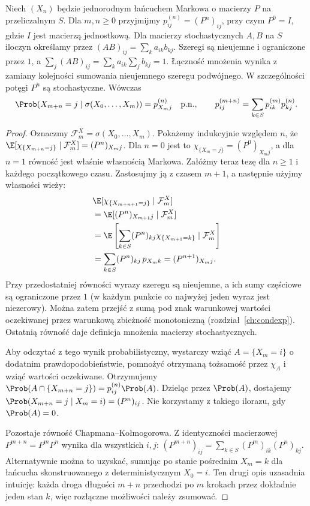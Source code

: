 \begin{twierdzenie}
\label{thm:rp1-12-chapman-kolmogorov}
Niech $(X_n)$ będzie jednorodnym łańcuchem Markowa
o macierzy $P$ na przeliczalnym $S$. Dla $m,n\geq0$
przyjmijmy $p_{ij}^{(n)}=(P^n)_{ij}$, przy czym
$P^0=I$, gdzie $I$ jest macierzą jednostkową.
Dla macierzy stochastycznych $A,B$ na $S$
iloczyn określamy przez $(AB)_{ij}=\sum_k a_{ik}b_{kj}$.
Szeregi są nieujemne i ograniczone przez $1$, a
$\sum_j(AB)_{ij}=\sum_k a_{ik}\sum_j b_{kj}=1$.
Łączność mnożenia wynika z zamiany kolejności
sumowania nieujemnego szeregu podwójnego.
W szczególności potęgi $P^n$ są stochastyczne.
Wówczas
\[
\Prob(X_{m+n}=j\mid\sigma(X_0,\ldots,X_m))
=p^{(n)}_{X_mj}\quad\text{p.n.},\qquad
p_{ij}^{(m+n)}=\sum_{k\in S}p_{ik}^{(m)}p_{kj}^{(n)}.
\]
\end{twierdzenie}
\begin{proof}
Oznaczmy $\mathcal F_m^X=\sigma(X_0,\ldots,X_m)$.
Pokażemy indukcyjnie względem $n$, że
$\E[\chi_{\{X_{m+n}=j\}}\mid\mathcal F_m^X]
=(P^n)_{X_mj}$. Dla $n=0$ jest to
$\chi_{\{X_m=j\}}=(P^0)_{X_mj}$, a dla $n=1$
równość jest właśnie własnością Markowa.
Załóżmy teraz tezę dla $n\geq1$ i każdego
początkowego czasu. Zastosujmy ją z czasem $m+1$,
a następnie użyjmy własności wieży:
\begin{align*}
&\E[\chi_{\{X_{m+n+1}=j\}}\mid\mathcal F_m^X]\\
&=\E[(P^n)_{X_{m+1}j}\mid\mathcal F_m^X]\\
&=\E\left[\sum_{k\in S}(P^n)_{kj}
 \chi_{\{X_{m+1}=k\}}\mid\mathcal F_m^X\right]\\
&=\sum_{k\in S}(P^n)_{kj}\,p_{X_mk}
 =(P^{n+1})_{X_mj}.
\end{align*}
Przy przedostatniej równości wyrazy szeregu są
nieujemne, a ich sumy częściowe są ograniczone
przez $1$ (w każdym punkcie co najwyżej jeden
wyraz jest niezerowy). Można zatem przejść z sumą
pod znak warunkowej wartości oczekiwanej przez
warunkową zbieżność monotoniczną
(rozdział~\ref{ch:condexp}). Ostatnią równość daje
definicja mnożenia macierzy stochastycznych.

Aby odczytać z tego wynik probabilistyczny,
wystarczy wziąć $A=\{X_m=i\}$ o dodatnim
prawdopodobieństwie, pomnożyć otrzymaną
tożsamość przez $\chi_A$ i wziąć wartości oczekiwane.
Otrzymujemy $\Prob(A\cap\{X_{m+n}=j\})
=p_{ij}^{(n)}\Prob(A)$. Dzieląc przez $\Prob(A)$,
dostajemy $\Prob(X_{m+n}=j\mid X_m=i)=(P^n)_{ij}$.
Nie korzystamy z takiego ilorazu, gdy $\Prob(A)=0$.

Pozostaje równość Chapmana--Kołmogorowa. Z
identyczności macierzowej $P^{m+n}=P^mP^n$
wynika dla wszystkich $i,j$:
$(P^{m+n})_{ij}=\sum_{k\in S}(P^m)_{ik}(P^n)_{kj}$.
Alternatywnie można to uzyskać, sumując po stanie
pośrednim $X_m=k$ dla łańcucha skonstruowanego
z deterministycznym $X_0=i$. Ten drugi opis
uzasadnia intuicję: każda droga długości $m+n$
przechodzi po $m$ krokach przez dokładnie jeden
stan $k$, więc rozłączne możliwości należy zsumować.
\end{proof}


